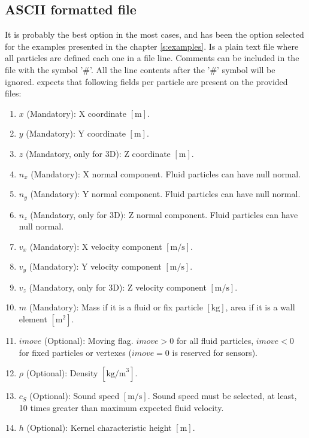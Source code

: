 \subsection{ASCII formatted file}
\label{sss:partsFile:ASCII}
%
It is probably the best option in the most cases, and has
been the option selected for the examples presented in the
chapter \ref{s:examples}. Is a plain text file where all
particles are defined each one in a file line.\rc
%
Comments can be included in the file with the symbol '\#'.
All the line contents after the '\#' symbol will be ignored.\rc
%
\NAME expects that following fields per particle are present
on the provided files:
%
\begin{enumerate}
	\item \textbf{$x$} (Mandatory): X coordinate $[\mbox{m}]$.
	\item \textbf{$y$} (Mandatory): Y coordinate $[\mbox{m}]$.
	\item \textbf{$z$} (Mandatory, only for 3D): Z coordinate $[\mbox{m}]$.
	\item \textbf{$n_x$} (Mandatory): X normal component. Fluid particles can have null normal.
	\item \textbf{$n_y$} (Mandatory): Y normal component. Fluid particles can have null normal.
	\item \textbf{$n_z$} (Mandatory, only for 3D): Z normal component. Fluid particles can have null normal.
	\item \textbf{$v_x$} (Mandatory): X velocity component $[\mbox{m/s}]$.
	\item \textbf{$v_y$} (Mandatory): Y velocity component $[\mbox{m/s}]$.
	\item \textbf{$v_z$} (Mandatory, only for 3D): Z velocity component $[\mbox{m/s}]$.
	\item \textbf{$m$} (Mandatory): Mass if it is a fluid or fix particle $[\mbox{kg}]$, area if it is a wall element $[\mbox{m}^2]$.
	\item \textbf{$imove$} (Optional): Moving flag. $imove > 0$ for all fluid particles, $imove < 0$ for fixed
	particles or vertexes ($imove = 0$ is reserved for sensors).
	\item \textbf{$\rho$} (Optional): Density $[\mbox{kg/m}^3]$.
	\item \textbf{$c_S$} (Optional): Sound speed $[\mbox{m/s}]$. Sound speed must be selected, at least, 10
	times greater than maximum expected fluid velocity.
	\item \textbf{$h$} (Optional): Kernel characteristic height $[\mbox{m}]$.
\end{enumerate}

